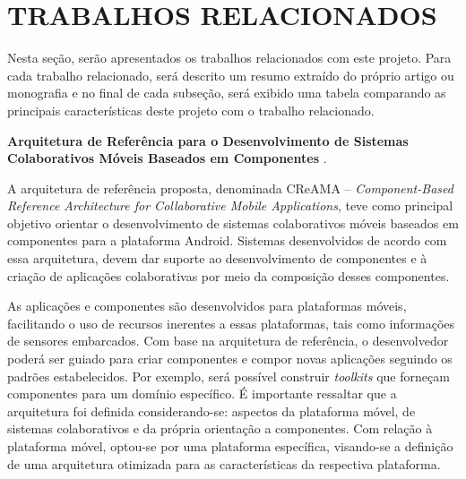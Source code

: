 
\section{TRABALHOS RELACIONADOS}
Nesta seção, serão apresentados os trabalhos relacionados com este projeto. Para cada trabalho relacionado, será descrito um resumo extraído do próprio artigo ou monografia e no final de cada subseção, será exibido uma tabela comparando as principais características deste projeto com o trabalho relacionado.\par

\textbf{Arquitetura de Referência para o Desenvolvimento de Sistemas Colaborativos Móveis Baseados em Componentes} \cite{melotti2014}.\par
A arquitetura de referência proposta, denominada CReAMA – \textit{Component-Based Reference Architecture for Collaborative Mobile Applications}, teve como principal objetivo orientar o desenvolvimento de sistemas colaborativos móveis baseados em componentes para a plataforma Android. Sistemas desenvolvidos de acordo com essa arquitetura, devem dar suporte ao desenvolvimento de componentes e à criação de aplicações colaborativas por meio da composição desses componentes.\par

As aplicações e componentes são desenvolvidos para plataformas móveis, facilitando o uso de recursos inerentes a essas plataformas, tais como informações de sensores embarcados. Com base na arquitetura de referência, o desenvolvedor poderá ser guiado para criar componentes e compor novas aplicações seguindo os padrões estabelecidos. Por exemplo, será possível construir \textit{toolkits} que forneçam componentes para um domínio específico. É importante ressaltar que a arquitetura foi definida considerando-se: aspectos da plataforma móvel, de sistemas colaborativos e da própria orientação a componentes. Com relação à plataforma móvel, optou-se por uma plataforma específica, visando-se a definição de uma arquitetura otimizada para as características da respectiva plataforma.\par

